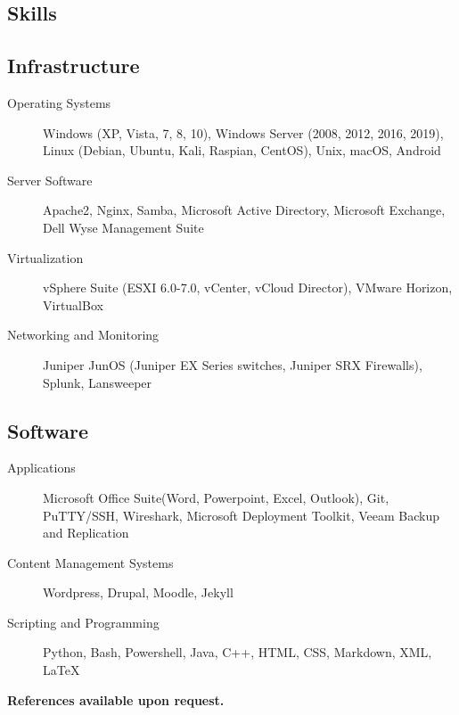 \documentclass{article}
\begin{document}
\begin{samepage}
\section{Skills}

\subsection{Infrastructure}
\begin{description}
\item[Operating Systems] Windows (XP, Vista, 7, 8, 10), Windows Server (2008, 2012, 2016, 2019), Linux (Debian, Ubuntu, Kali, Raspian, CentOS), Unix,  macOS, Android
\item[Server Software] Apache2, Nginx, Samba, Microsoft Active Directory, Microsoft Exchange, Dell Wyse Management Suite
\item[Virtualization] vSphere Suite (ESXI 6.0-7.0, vCenter, vCloud Director), VMware Horizon, VirtualBox
\item[Networking and Monitoring] Juniper JunOS (Juniper EX Series switches, Juniper SRX Firewalls), Splunk, Lansweeper
\end{description}

\subsection{Software}

\begin{description}
\item[Applications] Microsoft Office Suite(Word, Powerpoint, Excel, Outlook), Git, PuTTY/SSH, Wireshark, Microsoft Deployment Toolkit, Veeam Backup and Replication
\item[Content Management Systems] Wordpress, Drupal, Moodle, Jekyll
\item[Scripting and Programming] Python, Bash, Powershell, Java, C++, HTML, CSS, Markdown, XML, {\LaTeX}
\end{description}


\begin{center}
\textbf{References available upon request.}
\end{center}

\thispagestyle{empty}
\end{samepage}
\end{document}

